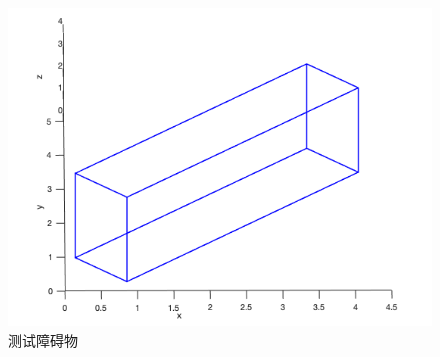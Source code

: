 \begin{figure}[!htb]
    \centering
    \includegraphics[width=12cm]{figures/obstacle_ex.png}
    \caption{测试障碍物}
    \label{fig:obstacle_ex}
\end{figure}

\FloatBarrier

